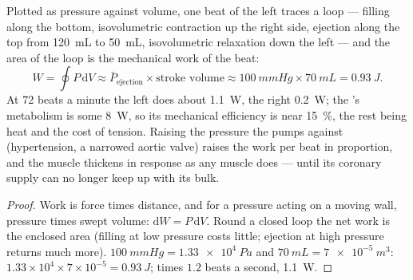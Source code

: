 \begin{theorem}\label{thm:b2:heart:work}
Plotted as pressure against volume, one beat of the left 
traces a loop --- filling along the bottom, isovolumetric
contraction up the right side, ejection along the top from
\qty{120}{mL} to \qty{50}{mL}, isovolumetric relaxation down the
left --- and the area of the loop is the mechanical work of the
beat:
\[
W = \oint P\,\mathrm{d}V \approx \bar P_{\text{ejection}}\times \text{stroke volume} \approx \qty{100}{mmHg}\times\qty{70}{mL} = \qty{0.93}{J}.
\]
At 72 beats a minute the left  does about \qty{1.1}{W}, the
right \qty{0.2}{W}; the 's metabolism is some \qty{8}{W}, so its
mechanical efficiency is near \qty{15}{\%}, the rest being heat and
the cost of tension. Raising the pressure the  pumps against
(hypertension, a narrowed aortic valve) raises the work per beat in
proportion, and the muscle thickens in response as any muscle does
--- until its coronary supply can no longer keep up with its bulk.
\end{theorem}
\begin{proof}
Work is force times distance, and for a pressure acting on a moving
wall, pressure times swept volume: $\mathrm{d}W = P\,\mathrm{d}V$.
Round a closed loop the net work is the enclosed area (filling at
low pressure costs little; ejection at high pressure returns much
more). $\qty{100}{mmHg} = \qty{1.33e4}{Pa}$ and $\qty{70}{mL} =
\qty{7e-5}{m^3}$: $1.33\times 10^{4}\times 7\times 10^{-5} =
\qty{0.93}{J}$; times $1.2$ beats a second, \qty{1.1}{W}.
\end{proof}


